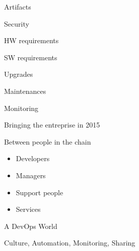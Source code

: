 \begin{iframe}
\item Artifacts
\item Security
\item HW requirements
\item SW requirements
\item Upgrades
\item Maintenances
\item Monitoring
\end{iframe}
\begin{iframe}
\item Bringing the entreprise in 2015
\item Between people in the chain
    \begin{itemize}
        \item Developers
        \item Managers
        \item Support people
        \item Services
    \end{itemize}
\item A DevOps World
\item Culture, Automation, Monitoring, Sharing
\end{iframe}


\thankyouSlide
\renewcommand{\insertLogo}{}
\contactSlide
